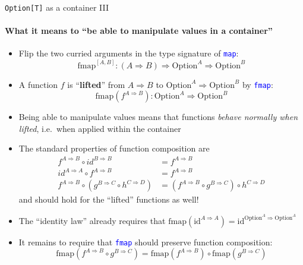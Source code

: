 \documentclass[english]{beamer}
\begin{document}
\begin{frame}{\texttt{Option{[}T{]}} as a container III}


\framesubtitle{What it means to ``be able to manipulate values in a container''}
\begin{itemize}
\item Flip the two curried arguments in the type signature of \texttt{\textcolor{blue}{\footnotesize{}map}}:{\footnotesize{}
\[
\text{fmap}^{[A,B]}:\left(A\Rightarrow B\right)\Rightarrow\text{Option}^{A}\Rightarrow\text{Option}^{B}
\]
}{\footnotesize \par}
\item A function $f$ is ``\textbf{lifted}'' from $A\Rightarrow B$ to
$\text{Option}^{A}\Rightarrow\text{Option}^{B}$ by \texttt{\textcolor{blue}{\footnotesize{}fmap}}:{\footnotesize{}
\[
\text{fmap}(f^{A\Rightarrow B}):\text{Option}^{A}\Rightarrow\text{Option}^{B}
\]
}{\footnotesize \par}
\item Being able to manipulate values means that functions \emph{behave
normally when lifted}, i.e.\ when applied within the container
\item The standard properties of function composition are{\footnotesize{}
\begin{align*}
f^{A\Rightarrow B}\circ id^{B\Rightarrow B} & =f^{A\Rightarrow B}\\
id^{A\Rightarrow A}\circ f^{A\Rightarrow B} & =f^{A\Rightarrow B}\\
f^{A\Rightarrow B}\circ(g^{B\Rightarrow C}\circ h^{C\Rightarrow D}) & =(f^{A\Rightarrow B}\circ g^{B\Rightarrow C})\circ h^{C\Rightarrow D}
\end{align*}
}and should hold for the ``lifted'' functions as well!
\item The ``identity law'' already requires that {\footnotesize{}$\text{fmap}(\text{id}^{A\Rightarrow A})=\text{id}^{\text{Option}^{A}\Rightarrow\text{Option}^{A}}$}{\footnotesize \par}
\item It remains to require that \texttt{\textcolor{blue}{\footnotesize{}fmap}}
should preserve function composition:{\footnotesize{}
\[
\text{fmap}(f^{A\Rightarrow B}\circ g^{B\Rightarrow C})=\text{fmap}(f^{A\Rightarrow B})\circ\text{fmap}(g^{B\Rightarrow C})
\]
}{\footnotesize \par}
\end{itemize}
\end{frame}
\end{document}
